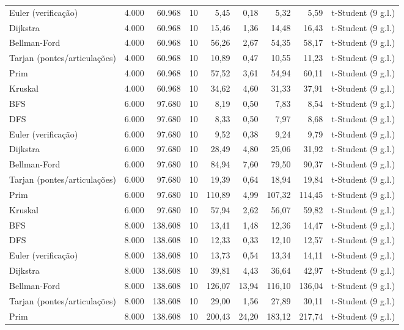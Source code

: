 \begin{table}[ht]
\begin{tabular}{lrrrrrrrl}
Euler (verificação) & 4.000 & 60.968 & 10 & 5,45 & 0,18 & 5,32 & 5,59 & t-Student (9 g.l.) \\
Dijkstra & 4.000 & 60.968 & 10 & 15,46 & 1,36 & 14,48 & 16,43 & t-Student (9 g.l.) \\
Bellman-Ford & 4.000 & 60.968 & 10 & 56,26 & 2,67 & 54,35 & 58,17 & t-Student (9 g.l.) \\
Tarjan (pontes/articulações) & 4.000 & 60.968 & 10 & 10,89 & 0,47 & 10,55 & 11,23 & t-Student (9 g.l.) \\
Prim & 4.000 & 60.968 & 10 & 57,52 & 3,61 & 54,94 & 60,11 & t-Student (9 g.l.) \\
Kruskal & 4.000 & 60.968 & 10 & 34,62 & 4,60 & 31,33 & 37,91 & t-Student (9 g.l.) \\
BFS & 6.000 & 97.680 & 10 & 8,19 & 0,50 & 7,83 & 8,54 & t-Student (9 g.l.) \\
DFS & 6.000 & 97.680 & 10 & 8,33 & 0,50 & 7,97 & 8,68 & t-Student (9 g.l.) \\
Euler (verificação) & 6.000 & 97.680 & 10 & 9,52 & 0,38 & 9,24 & 9,79 & t-Student (9 g.l.) \\
Dijkstra & 6.000 & 97.680 & 10 & 28,49 & 4,80 & 25,06 & 31,92 & t-Student (9 g.l.) \\
Bellman-Ford & 6.000 & 97.680 & 10 & 84,94 & 7,60 & 79,50 & 90,37 & t-Student (9 g.l.) \\
Tarjan (pontes/articulações) & 6.000 & 97.680 & 10 & 19,39 & 0,64 & 18,94 & 19,84 & t-Student (9 g.l.) \\
Prim & 6.000 & 97.680 & 10 & 110,89 & 4,99 & 107,32 & 114,45 & t-Student (9 g.l.) \\
Kruskal & 6.000 & 97.680 & 10 & 57,94 & 2,62 & 56,07 & 59,82 & t-Student (9 g.l.) \\
BFS & 8.000 & 138.608 & 10 & 13,41 & 1,48 & 12,36 & 14,47 & t-Student (9 g.l.) \\
DFS & 8.000 & 138.608 & 10 & 12,33 & 0,33 & 12,10 & 12,57 & t-Student (9 g.l.) \\
Euler (verificação) & 8.000 & 138.608 & 10 & 13,73 & 0,54 & 13,34 & 14,11 & t-Student (9 g.l.) \\
Dijkstra & 8.000 & 138.608 & 10 & 39,81 & 4,43 & 36,64 & 42,97 & t-Student (9 g.l.) \\
Bellman-Ford & 8.000 & 138.608 & 10 & 126,07 & 13,94 & 116,10 & 136,04 & t-Student (9 g.l.) \\
Tarjan (pontes/articulações) & 8.000 & 138.608 & 10 & 29,00 & 1,56 & 27,89 & 30,11 & t-Student (9 g.l.) \\
Prim & 8.000 & 138.608 & 10 & 200,43 & 24,20 & 183,12 & 217,74 & t-Student (9 g.l.) \\

\end{tabular}
\end{table}
